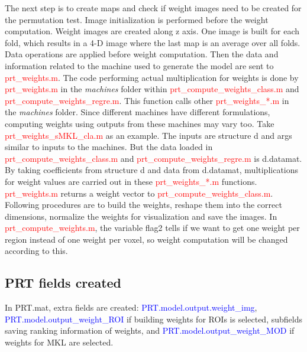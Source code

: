 The next step is to create maps and check if weight images need to be created for the permutation test. Image initialization is performed before the weight computation. Weight images are created along z axis. One image is built for each fold, which results in a 4-D image where the last map is an average over all folds. Data operations are applied before weight computation. Then the data and information related to the machine used to generate the model are sent to \textcolor{red}{prt\_weights.m}. The code performing actual multiplication for weights is done by \textcolor{red}{prt\_weights.m} in the \textit{machines} folder within \textcolor{red}{prt\_compute\_weights\_class.m} and \textcolor{red}{prt\_compute\_weights\_regre.m}. This function calls other \textcolor{red}{prt\_weights\_*.m} in the \textit{machines} folder. Since different machines have different formulations, computing weights using outputs from these machines may vary too. Take \textcolor{red}{prt\_weights\_sMKL\_cla.m} as an example. The inputs are structure d and args similar to inputs to the machines. But the data loaded in \textcolor{red}{prt\_compute\_weights\_class.m} and \textcolor{red}{prt\_compute\_weights\_regre.m} is d.datamat. By taking coefficients from structure d and data from d.datamat, multiplications for weight values are carried out in these \textcolor{red}{prt\_weights\_*.m} functions. \textcolor{red}{prt\_weights.m} returns a weight vector to \textcolor{red}{prt\_compute\_weights\_class.m}.  Following procedures are to build the weights, reshape them into the correct dimensions, normalize the weights for visualization and save the images. In \textcolor{red}{prt\_compute\_weights.m}, the variable flag2 tells if we want to get one weight per region instead of one weight per voxel, so weight computation will be changed according to this. 




\subsection{PRT fields created}

In PRT.mat, extra fields are created: \textcolor{blue}{PRT.model.output.weight\_img}, \textcolor{blue}{PRT.model.output\_weight\_ROI} if building weights for ROIs is selected, subfields saving ranking information of weights, and \textcolor{blue}{PRT.model.output\_weight\_MOD} if weights for MKL are selected. 




